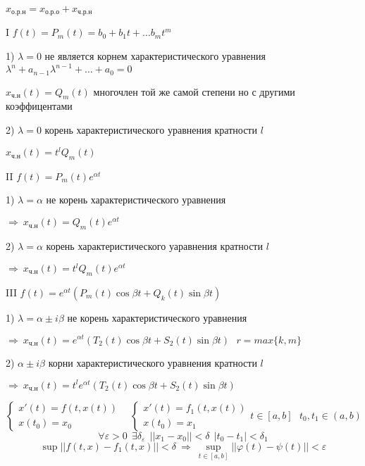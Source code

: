 \begin{theorem}
  $x_{\text{о.р.н}} = x_{\text{о.р.о}} + x_{\text{ч.р.н}}$

  I $f(t) = P_m(t) = b_0 + b_1 t + \ldots b_m t^m$

  1) $\lambda = 0$ не является корнем характеристического уравнения
  $\lambda^n + a_{n-1} \lambda^{n-1} + \ldots + a_0 = 0$

  $x_{\text{ч.н}}(t) = Q_m(t)$ многочлен той же самой степени но с другими
  коэффицентами

  2) $\lambda = 0$ корень характеристического уравнения кратности $l$

  $x_{\text{ч.н}}(t) = t^l Q_m(t)$

  II $f(t) = P_m(t) e^{\alpha t}$

  1) $\lambda = \alpha$ не корень характеристического уравнения

  $\Rightarrow ~ x_{\text{ч.н}}(t) = Q_m(t) e^{\alpha t}$

  2) $\lambda = \alpha$ корень характеристического уаравнения кратности $l$

  $\Rightarrow ~ x_{\text{ч.н}}(t) = t^l Q_m(t) e^{\alpha t}$

  III $f(t) = e^{\alpha t} (P_m(t) \cos \beta t + Q_k(t) \sin \beta t)$

  1) $\lambda = \alpha \pm i\beta$ не корень характеристического уравнения

  $\Rightarrow ~ x_{\text{ч.н}}(t) = e^{\alpha t}(T_2(t) \cos \beta t + S_2(t)
  \sin \beta t) ~~~ r = max\{ k,m \}$

  2) $\alpha \pm i\beta$ корни характеристического уравнения кратности $l$

  $\Rightarrow ~ x_{\text{ч.н}}(t) = t^l e^{\alpha t}(T_2(t) \cos \beta t +
  S_2(t) \sin \beta t)$
\end{theorem}

\begin{define}
  $$
  \left\{
  \begin{array}{l}
    x'(t) = f(t, x(t)) \\
    x(t_0) = x_0
  \end{array}
  \right.
  ~~~~
  \left\{
  \begin{array}{l}
    x'(t) = f_1(t, x(t)) \\
    x(t_0) = x_1
  \end{array}
  \right.
  t \in [a,b] ~~~ t_0, t_1 \in (a,b)
  $$
  $$
  \forall \varepsilon > 0 ~~ \exists \delta_{\varepsilon} ~~ ||x_1 - x_0||
  < \delta ~~ |t_0 - t_1| < \delta_1
  $$
  $$
  \sup ||f(t,x) - f_1(t,x)|| < \delta
  ~ \Rightarrow ~ \sup_{t \in [a,b]} ||\varphi(t) - \psi(t)|| < \varepsilon
  $$
\end{define}

